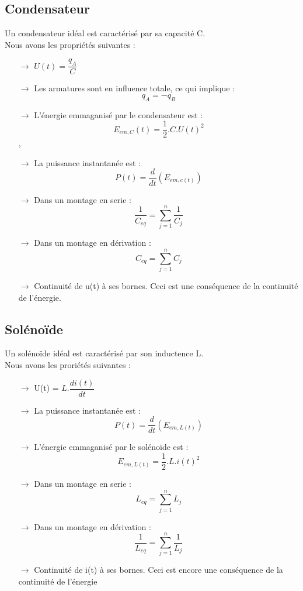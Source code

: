 \subsection{Condensateur}
Un condensateur idéal est caractérisé par sa capacité C.\\
Nous avons les propriétés suivantes :\\
\begin{itemize}
 \item[$\rightarrow$] $U(t) = \dfrac{q_A}{C}$ \\
 \item[$\rightarrow$] Les armatures sont en influence totale, ce qui implique : $$q_A = -q_B$$
 \item[$\rightarrow$] L'énergie emmaganisé par le condensateur est : $$E_{em,C}(t) = \dfrac{1}{2}.C.U(t)^2$$
,\item[$\rightarrow$] La puissance instantanée est : $$P(t) = \dfrac{d}{dt}(E_{em,c(t)})$$
 \item[$\rightarrow$] Dans un montage en serie : $$\dfrac{1}{C_{eq}} = \sum_{j=1}^n \dfrac{1}{C_j}$$
 \item[$\rightarrow$] Dans un montage en dérivation : $$C_{eq} = \sum_{j=1}^n C_j$$
 \item[$\rightarrow$] Continuité de u(t) à ses bornes. Ceci est une conséquence de la continuité de l'énergie.
\end{itemize}
\subsection{Solénoïde}
Un solénoïde idéal est caractérisé par son inductence L.\\
Nous avons les proriétés suivantes :\\
\begin{itemize}
 \item[$\rightarrow$] U(t) = $L.\dfrac{di(t)}{dt}$ \\
 \item[$\rightarrow$] La puissance instantanée est : $$P(t) = \dfrac{d}{dt}(E_{em,L(t)})$$
 \item[$\rightarrow$] L'énergie emmaganisé par le solénoïde est : $$E_{em,L(t)} = \dfrac{1}{2}.L.i(t)^2$$
 \item[$\rightarrow$] Dans un montage en serie : $$L_{eq} = \sum_{j=1}^n L_j$$
 \item[$\rightarrow$] Dans un montage en dérivation : $$\dfrac{1}{L_{eq}} = \sum_{j=1}^n \dfrac{1}{L_j}$$
 \item[$\rightarrow$] Continuité de i(t) à ses bornes. Ceci est encore une conséquence de la continuité de l'énergie
\end{itemize}

